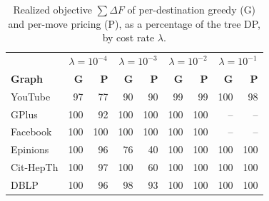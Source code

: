 \begin{table}[t]
\centering
\caption{Realized objective $\sum\Delta F$ of per-destination greedy (G) and per-move pricing (P), as a percentage of the tree DP, by cost rate $\lambda$.}
\label{tab:sel-objective}
\begin{tabular*}{\linewidth}{@{\extracolsep{\fill}}lrrrrrrrr@{}}
\toprule
& \multicolumn{2}{c}{$\lambda=10^{-4}$} & \multicolumn{2}{c}{$\lambda=10^{-3}$} & \multicolumn{2}{c}{$\lambda=10^{-2}$} & \multicolumn{2}{c}{$\lambda=10^{-1}$} \\
\textbf{Graph} & \textbf{G} & \textbf{P} & \textbf{G} & \textbf{P} & \textbf{G} & \textbf{P} & \textbf{G} & \textbf{P} \\
\midrule
YouTube & 97 & 77 & 90 & 90 & 99 & 99 & 100 & 98 \\
GPlus & 100 & 92 & 100 & 100 & 100 & 100 & -- & -- \\
Facebook & 100 & 100 & 100 & 100 & 100 & 100 & -- & -- \\
Epinions & 100 & 96 & 76 & 40 & 100 & 100 & 100 & 100 \\
Cit-HepTh & 100 & 97 & 100 & 60 & 100 & 100 & 100 & 100 \\
DBLP & 100 & 96 & 98 & 93 & 100 & 100 & 100 & 100 \\
\bottomrule
\end{tabular*}
\end{table}
